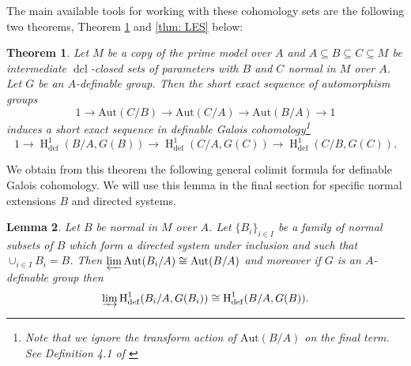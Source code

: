 \documentclass{amsart}
\newtheorem{theorem}{Theorem}[section]
\newtheorem{lemma}[theorem]{Lemma}
\theoremstyle{definition}
\theoremstyle{remark}
\numberwithin{equation}{section}
\def \defin {\operatorname{def}}
\def \HH {\operatorname{H}}
\def \aut {\text{Aut}}
\def \dcl {\operatorname{dcl}}
\begin{document}
The main available tools for working with these cohomology sets are the following two theorems, Theorem \ref{thm: SES} and \ref{thm: LES} below:

\begin{theorem}\label{thm: SES}\cite{MERETZKY_SES}
    Let $M$ be a copy of the prime model over $A$ and $A \subseteq B \subseteq C\subseteq M$ be intermediate $\dcl$-closed sets of parameters with $B$ and $C$ normal in $M$ over $A$. Let $G$ be an $A$-definable group. Then the short exact sequence of automorphism groups $$1 \to \aut(C/B) \to \aut(C/A) \to \aut(B/A) \to 1$$ induces a short exact sequence in definable Galois cohomology\footnote{Note that we ignore the transform action of $\aut(B/A)$ on the final term. See Definition 4.1 of \cite{MERETZKY_SES}} $$1 \to \HH^1_{\defin}(B/A,  G(B)) \to \HH^1_{\defin}(C/A, G(C)) \to \HH^1_{\defin}(C/B, G(C)).$$
\end{theorem}

We obtain from this theorem the following general colimit formula for definable Galois cohomology. We will use this lemma in the final section for specific normal extensions $B$ and directed systems.

\begin{lemma}\label{lem: colim}
    Let $B$ be normal in $M$ over $A$. Let $\{B_i\}_{i \in I}$ be a family of normal subsets of $B$ which form a directed system under inclusion and such that $\cup_{i \in I}B_i = B$. Then $\varprojlim \aut(B_i/A) \cong \aut(B/A)$ and moreover if $G$ is an $A$-definable group then $$\varinjlim \HH^1_{\defin}(B_i/A,G(B_i)) \cong \HH^1_{\defin}(B/A,G(B)).$$
\end{lemma}
\end{document}
